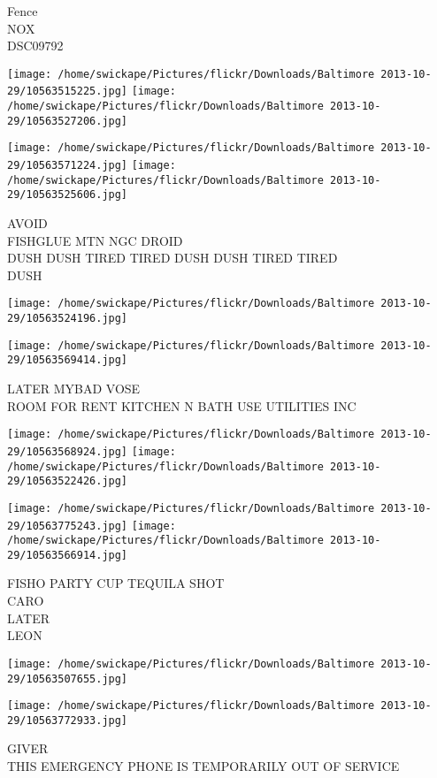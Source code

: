 \documentclass[10pt,letterpaper]{article}
\begin{document}
Fence\\
NOX\\
DSC09792
\pagebreak

\texttt{[image: /home/swickape/Pictures/flickr/Downloads/Baltimore 2013-10-29/10563515225.jpg]}
\texttt{[image: /home/swickape/Pictures/flickr/Downloads/Baltimore 2013-10-29/10563527206.jpg]}

\texttt{[image: /home/swickape/Pictures/flickr/Downloads/Baltimore 2013-10-29/10563571224.jpg]}
\texttt{[image: /home/swickape/Pictures/flickr/Downloads/Baltimore 2013-10-29/10563525606.jpg]}

AVOID\\
FISHGLUE MTN NGC DROID\\
DUSH DUSH TIRED TIRED DUSH DUSH TIRED TIRED\\
DUSH
\pagebreak

\texttt{[image: /home/swickape/Pictures/flickr/Downloads/Baltimore 2013-10-29/10563524196.jpg]}

\vspace{0.25in}
\texttt{[image: /home/swickape/Pictures/flickr/Downloads/Baltimore 2013-10-29/10563569414.jpg]}

LATER MYBAD VOSE\\
ROOM FOR RENT KITCHEN N BATH USE UTILITIES INC
\pagebreak

\texttt{[image: /home/swickape/Pictures/flickr/Downloads/Baltimore 2013-10-29/10563568924.jpg]}
\texttt{[image: /home/swickape/Pictures/flickr/Downloads/Baltimore 2013-10-29/10563522426.jpg]}

\texttt{[image: /home/swickape/Pictures/flickr/Downloads/Baltimore 2013-10-29/10563775243.jpg]}
\texttt{[image: /home/swickape/Pictures/flickr/Downloads/Baltimore 2013-10-29/10563566914.jpg]}

FISHO PARTY CUP TEQUILA SHOT\\
CARO\\
LATER\\
LEON
\pagebreak

\texttt{[image: /home/swickape/Pictures/flickr/Downloads/Baltimore 2013-10-29/10563507655.jpg]}

\vspace{0.25in}
\texttt{[image: /home/swickape/Pictures/flickr/Downloads/Baltimore 2013-10-29/10563772933.jpg]}

GIVER\\
THIS EMERGENCY PHONE IS TEMPORARILY OUT OF SERVICE
\pagebreak
\end{document}
